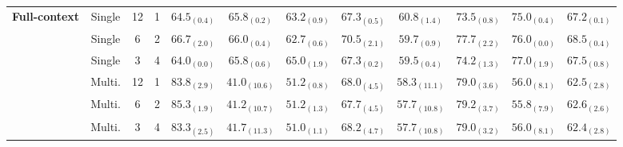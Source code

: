 \begin{table}[hbt]
{\begin{tabular}{lccc|cccccccc}
\textbf{Full-context}  & Single & 12 & 1 & $64.5_{(0.4)}$ & $65.8_{(0.2)}$ & $63.2_{(0.9)}$ & $67.3_{(0.5)}$ & $60.8_{(1.4)}$ & $73.5_{(0.8)}$ & $75.0_{(0.4)}$ & $67.2_{(0.1)}$ \\
 & Single & 6 & 2 & $66.7_{(2.0)}$ & $66.0_{(0.4)}$ & $62.7_{(0.6)}$ & $70.5_{(2.1)}$ & $59.7_{(0.9)}$ & $77.7_{(2.2)}$ & $76.0_{(0.0)}$ & $68.5_{(0.4)}$ \\
 & Single & 3 & 4 & $64.0_{(0.0)}$ & $65.8_{(0.6)}$ & $65.0_{(1.9)}$ & $67.3_{(0.2)}$ & $59.5_{(0.4)}$ & $74.2_{(1.3)}$ & $77.0_{(1.9)}$ & $67.5_{(0.8)}$\\ \cmidrule{2-12}
 & Multi. & 12 & 1 & $83.8_{(2.9)}$ & $41.0_{(10.6)}$ & $51.2_{(0.8)}$ & $68.0_{(4.5)}$ & $58.3_{(11.1)}$ & $79.0_{(3.6)}$ & $56.0_{(8.1)}$ & $62.5_{(2.8)}$ \\
 & Multi. & 6 & 2 & $85.3_{(1.9)}$ & $41.2_{(10.7)}$ & $51.2_{(1.3)}$ & $67.7_{(4.5)}$ & $57.7_{(10.8)}$ & $79.2_{(3.7)}$ & $55.8_{(7.9)}$ & $62.6_{(2.6)}$ \\
 & Multi. & 3 & 4 & $83.3_{(2.5)}$ & $41.7_{(11.3)}$ & $51.0_{(1.1)}$ & $68.2_{(4.7)}$ & $57.7_{(10.8)}$ & $79.0_{(3.2)}$ & $56.0_{(8.1)}$ & $62.4_{(2.8)}$ \\ \bottomrule
\end{tabular}}
\end{table}




